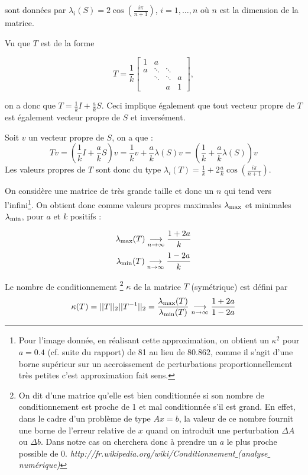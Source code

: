 sont données par $\lambda_i(S) = 2 \cos(\frac{i\pi}{n+1})$, $i= 1, \ldots , n$ où $n$ est la dimension de la matrice.

Vu que $T$ est de la forme

$$
 T = \frac{1}{k}
 \begin{bmatrix}
    1 & a 		& 			& \\
    a & \ddots 	& \ddots 	& \\
      & \ddots 	& \ddots 	& a \\
      & 		& a			& 1
  \end{bmatrix},
$$

on a donc que $T = \frac{1}{k} I + \frac{a}{k} S$. Ceci implique également que tout vecteur propre de $T$ est également vecteur propre de $S$ et inversément.

Soit $v$ un vecteur propre de $S$, on a que :
\begin{equation}
T v = \left( \frac{1}{k} I + \frac{a}{k} S \right) v =
\frac{1}{k} v + \frac{a}{k} \lambda(S) v = \left(\frac{1}{k} + \frac{a}{k} \lambda(S)\right) v
\end{equation}
Les valeurs propres de $T$ sont donc du type $\lambda_i(T) = \frac{1}{k} + 2 \frac{a}{k} \cos(\frac{i\pi}{n+1})$.

On considère une matrice de très grande taille et donc un $n$ qui tend vers l'infini\footnote{ Pour l'image donnée, en réalisant cette approximation, on obtient un $\kappa^2 $ pour $a = 0.4$ (cf. suite du rapport) de  81 au lieu de 80.862, comme il s'agit d'une borne supérieur sur un accroissement de perturbations proportionnellement très petites c'est approximation fait sens.}. 
On obtient donc comme valeurs propres maximales $\lambda_\mathrm{max}$ et minimales $\lambda_\mathrm{min}$,
pour $a$ et $k$ positifs :

$$\lambda_\mathrm{max}(T) \underset{n\rightarrow \infty}{\longrightarrow} \frac{1+2a}{k} $$
$$\lambda_\mathrm{min} (T) \underset{n\rightarrow \infty}{\longrightarrow} \frac{1-2a}{k} $$

Le nombre de conditionnement
\footnote{On dit d'une matrice qu'elle est bien conditionnée si son nombre de conditionnement
  est proche de 1 et mal conditionnée s'il est grand.
En effet, dans le cadre d'un problème de type $Ax = b$,
la valeur de ce nombre fournit une borne de l'erreur relative de $x$ quand on introduit une perturbation $\Delta A $ ou $\Delta b$.
Dans notre cas on cherchera donc à prendre un $a$ le plus proche possible de 0.
\textit{http://fr.wikipedia.org/wiki/Conditionnement$\_$(analyse$\_$numérique)}}
 $\kappa$ de la matrice $T$ (symétrique) est défini par
\begin{equation}
	\kappa (T) = ||T||_2||T^{-1}||_2 = \frac{\lambda_\mathrm{max} (T)}{\lambda_\mathrm{min} (T)} \underset{n\rightarrow \infty}{\longrightarrow} \frac{1+2a}{1-2a}
\end{equation}

